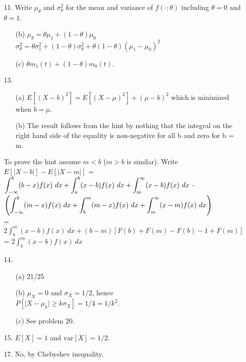 \begin{enumerate}
	\item[11.] Write $\mu_\theta$ and $\sigma^2_\theta$ for the mean and variance of $f(\cdot;\theta)$ including $\theta =0$ and $\theta=1$. \begin{enumerate}
	\item[(b)] $\mu_\theta = \theta\mu_1 + (1-\theta)\mu_0$ \\
	$\sigma^2_\theta = \theta\sigma^2_1 + (1-\theta)\sigma^2_0 + \theta(1-\theta)(\mu_1-\mu_0)^2$
	
	\item[(c)] $\theta m_1(t) + (1-\theta)m_0(t)$.
	
	\end{enumerate}
	
	\item[13.] \begin{enumerate}
		\item[(a)] $E[(X-b)^2] = E[(X-\mu)^2] + (\mu-b)^2$ which is minimized when $b = \mu$.
		\item[(b)] The result follows from the hint by nothing that the  integral on the right hand side of the equality is non-negative for all b and zero for b = m.
	\end{enumerate}
	To prove the hint assume $m < b$ ($m>b$ is similar).  Write $E[\vert X-b\vert] - E[\vert X-m\vert]$ = $\displaystyle \int_{-\infty}^b(b-x)f(x)\ dx + \int_a^b (x-b)f(x)\ dx + \int_m^\infty (x-b)f(x)\ dx$ - \\
	$\dsp \left( \int_{-\infty}^b(m-x)f(x)\ dx + \int_b^m (m-x)f(x)\ dx + \int_m^\infty (x-m)f(x)\ dx\right)$ \\
	= $2\int_b^m (x-b)f(x)\ dx + (b-m)[F(b) + F(m) - F(b) -1 + F(m)]$ \\
	= $2\int_b^m (x-b)f(x)\  dx$

	\item[14.] \begin{enumerate}
		\item[(a)] 21/25
		\item[(b)] $\mu_X = 0$ and $\sigma_X = 1/2$,  hence \\
		$P[\vert X-\mu_k\vert \ge k\sigma_X] = 1/4 = 1/k^2$.
		\item[(c)] See problem 20.
	\end{enumerate}

	\item[15.] $E[X]=1$ and $\text{var}[X]= 1/2$.
	
	\item[17.] No, by Chebyshev inequality.
	

\end{enumerate}
